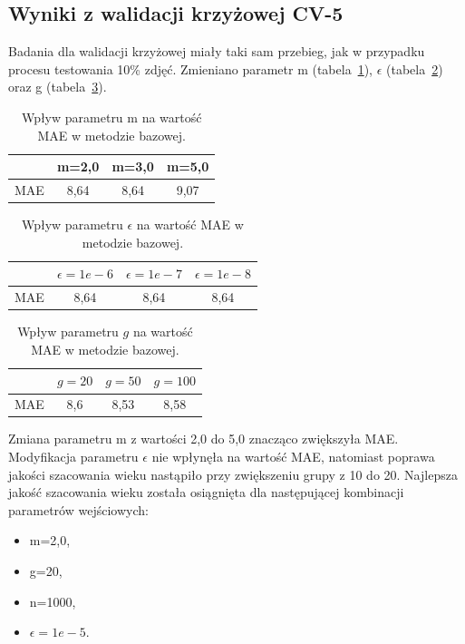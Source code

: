 \documentclass[a4paper,twoside,12pt]{book}
\begin{document}
    \subsection*{Wyniki z walidacji krzyżowej CV-5}
    Badania dla walidacji krzyżowej miały taki sam przebieg, jak w przypadku procesu testowania 10\% zdjęć.
    Zmieniano parametr m (tabela~\ref{tab.bazowa_m_cv}), $\epsilon$ (tabela~\ref{tab.bazowa_e_cv})
    oraz g (tabela~\ref{tab.bazowa_g_cv}).
    \begin{table}[]
        \centering
        \caption{Wpływ parametru m na wartość MAE w metodzie bazowej.}
        \begin{tabular}{|c|c|c|c|}
            \hline
            & m=2,0 & m=3,0 & m=5,0 \\ \hline
            MAE & 8,64 & 8,64 & 9,07 \\ \hline
        \end{tabular}
        \label{tab.bazowa_m_cv}
    \end{table}
    \begin{table}[]
        \centering
        \caption{Wpływ parametru $\epsilon$ na wartość MAE w metodzie bazowej.}
        \begin{tabular}{|c|c|c|c|}
            \hline
            & $\epsilon=1e-6$ & $\epsilon=1e-7$ & $\epsilon=1e-8$ \\ \hline
            MAE & 8,64 & 8,64 & 8,64 \\ \hline
        \end{tabular}
        \label{tab.bazowa_e_cv}
    \end{table}
    \begin{table}[]
        \centering
        \caption{Wpływ parametru $g$ na wartość MAE w metodzie bazowej.}
        \begin{tabular}{|c|c|c|c|}
            \hline
            & $g=20$ & $g=50$ & $g=100$ \\ \hline
            MAE & 8,6 & 8,53 & 8,58 \\ \hline
        \end{tabular}
        \label{tab.bazowa_g_cv}
    \end{table}
    Zmiana parametru m z wartości 2,0 do 5,0 znacząco zwiększyła MAE. Modyfikacja parametru $\epsilon$ nie wpłynęła
    na wartość MAE, natomiast poprawa jakości szacowania wieku nastąpiło przy zwiększeniu grupy z 10 do 20.
    Najlepsza jakość szacowania wieku została osiągnięta dla następującej kombinacji parametrów wejściowych:
    \begin{itemize}
        \item m=2,0,
        \item g=20,
        \item n=1000,
        \item $\epsilon=1e-5$.
    \end{itemize}
\end{document}
